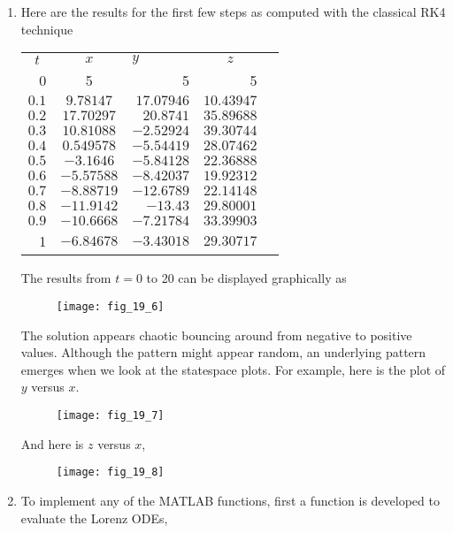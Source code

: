 \documentclass[../main.tex]{subfiles}
\begin{document}
\section{}
\begin{enumerate}[label=\bfseries(\alph*)]
\item Here are the results for the first few steps as computed with the classical RK4 technique
	\bigbreak
\begin{tabular}{rcrrr}
\multicolumn{1}{c}{$t$} & \multicolumn{1}{c}{$x$} & \multicolumn{1}{l}{$y$} & \multicolumn{1}{c}{$z$} \\
0 & 5 & 5 & 5 \\
$0.1$ & $9.78147$ & $17.07946$ & $10.43947$ \\
$0.2$ & $17.70297$ & $20.8741$ & $35.89688$ \\
$0.3$ & $10.81088$ & $-2.52924$ & $39.30744$ \\
$0.4$ & $0.549578$ & $-5.54419$ & $28.07462$ \\
$0.5$ & $-3.1646$ & $-5.84128$ & $22.36888$ \\
$0.6$ & $-5.57588$ & $-8.42037$ & $19.92312$ \\
$0.7$ & $-8.88719$ & $-12.6789$ & $22.14148$ \\
$0.8$ & $-11.9142$ & $-13.43$ & $29.80001$ \\
$0.9$ & $-10.6668$ & $-7.21784$ & $33.39903$ \\
1 & $-6.84678$ & $-3.43018$ & $29.30717$ \\
\end{tabular}
	\bigbreak
The results from $t=0$ to 20 can be displayed graphically as
	\bigbreak
	\begin{figure}[H]
		\texttt{[image: fig\_19\_6]}
		\label{fig:fig_19_6}
	\end{figure}
	\bigbreak
The solution appears chaotic bouncing around from negative to positive values. Although the pattern might appear random, an underlying pattern emerges when we look at the statespace plots. For example, here is the plot of $y$ versus $x$.
	\bigbreak
	\begin{figure}[H]
		\texttt{[image: fig\_19\_7]}
		\label{fig:fig_19_7}
	\end{figure}
	\bigbreak
And here is $z$ versus $x$,
	\bigbreak
	\begin{figure}[H]
		\texttt{[image: fig\_19\_8]}
		\label{fig:fig_19_8}
	\end{figure}
	\bigbreak
\item To implement any of the MATLAB functions, first a function is developed to evaluate the Lorenz ODEs,

\end{enumerate}
\end{document}
